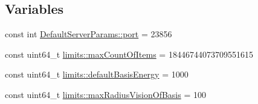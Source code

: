 \subsection*{Variables}
\begin{DoxyCompactItemize}
\item 
const int \hyperlink{a00114_a7ac0709dc92e311b3524c365a2a05d96}{Default\+Server\+Params\+::port} = 23856
\item 
const uint64\+\_\+t \hyperlink{a00115_a1fe7215d57cdf80c6fbd71a16853dcd2}{limits\+::max\+Count\+Of\+Items} = 18446744073709551615
\item 
const uint64\+\_\+t \hyperlink{a00115_a5ece0bc57b69f35c537f34cc06b620f5}{limits\+::default\+Basis\+Energy} = 1000
\item 
const uint64\+\_\+t \hyperlink{a00115_aa57018b6545bade5e6f69133071a1342}{limits\+::max\+Radius\+Vision\+Of\+Basis} = 100
\end{DoxyCompactItemize}
